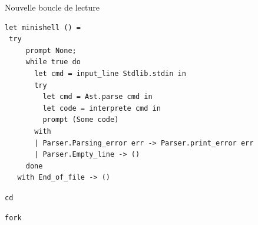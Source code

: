 \begin{frame}[fragile]{Nouvelle boucle de lecture}
\begin{lstlisting}
let minishell () =
 try
     prompt None;
     while true do
       let cmd = input_line Stdlib.stdin in
       try
         let cmd = Ast.parse cmd in
         let code = interprete cmd in
         prompt (Some code)
       with
       | Parser.Parsing_error err -> Parser.print_error err
       | Parser.Empty_line -> ()
     done
   with End_of_file -> ()
\end{lstlisting}
\end{frame}

\begin{frame}{\texttt{cd}}

\end{frame}

\begin{frame}{\texttt{fork}}

\end{frame}
